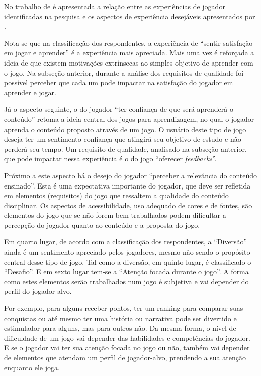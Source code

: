 No trabalho de  é apresentada a relação entre as experiências de jogador identificadas na pesquisa e os aspectos de experiência desejáveis apresentados por .

Nota-se que na classificação dos respondentes, a experiência de ``sentir satisfação em jogar e aprender'' é a experiência mais apreciada. Mais uma vez é reforçada a ideia de que existem motivações extrínsecas ao simples objetivo de aprender com o jogo. Na subseção anterior, durante a análise dos requisitos de qualidade foi possível perceber que cada um pode impactar na satisfação do jogador em aprender e jogar.  

Já o aspecto seguinte, o do jogador ``ter confiança de que será aprenderá o conteúdo'' retoma a ideia central dos jogos para aprendizagem, no qual o jogador aprenda o conteúdo proposto através de um jogo. O usuário deste tipo de jogo deseja ter um sentimento confiança que atingirá seu objetivo de estudo e não perderá seu tempo. Um requisito de qualidade, analisado na subseção anterior, que pode impactar nessa experiência é o do jogo ``oferecer \textit{feedbacks}''. 

Próximo a este aspecto há o desejo do jogador ``perceber a relevância do conteúdo ensinado''. Esta é uma expectativa importante do jogador, que deve ser refletida em elementos (requisitos) do jogo que ressaltem a qualidade do conteúdo disciplinar. Os aspectos de acessibilidade, uso adequado de cores e de fontes, são elementos do jogo que se não forem bem trabalhados podem dificultar a percepção do jogador quanto ao conteúdo e a proposta do jogo.

Em quarto lugar, de acordo com a classificação dos respondentes, a ``Diversão'' ainda é um sentimento apreciado pelos jogadores, mesmo não sendo o propósito central desse tipo de jogo. Tal como a diversão, em quinto lugar, é classificado o ``Desafio''. E em sexto lugar tem-se a ``Atenção focada durante o jogo''. A forma como estes elementos serão trabalhados num jogo é subjetiva e vai depender do perfil do jogador-alvo. 

Por exemplo, para alguns receber pontos, ter um ranking para comparar suas conquistas ou até mesmo ter uma história ou narrativa pode ser divertido e estimulador para alguns, mas para outros não. Da mesma forma, o nível de dificuldade de um jogo vai depender das habilidades e competências do jogador. E se o jogador vai ter sua atenção focada no jogo ou não, também vai depender de elementos que atendam um perfil de jogador-alvo, prendendo a sua atenção enquanto ele joga.

